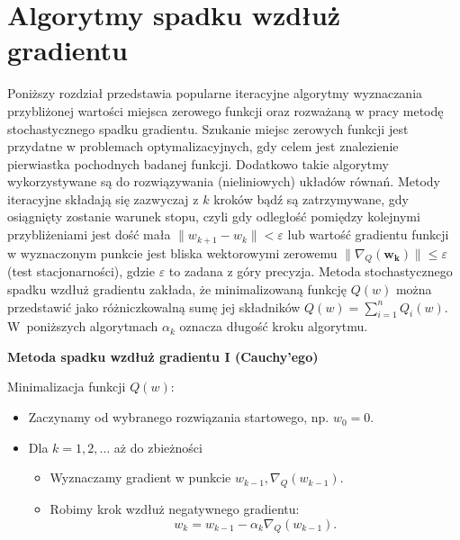 \newpage
\section{Algorytmy spadku wzdłuż gradientu}\label{R-N}

Poniższy rozdział przedstawia popularne iteracyjne algorytmy wyznaczania przybliżonej wartości miejsca zerowego funkcji oraz rozważaną w pracy metodę stochastycznego spadku gradientu. Szukanie miejsc zerowych funkcji jest przydatne w problemach optymalizacyjnych, gdy celem jest znalezienie pierwiastka pochodnych badanej funkcji. Dodatkowo takie algorytmy wykorzystywane są do rozwiązywania (nieliniowych) układów równań. Metody iteracyjne składają się zazwyczaj z $k$ kroków bądź są zatrzymywane, gdy osiągnięty zostanie warunek stopu, czyli gdy odległość pomiędzy kolejnymi przybliżeniami jest dość mała $\parallel w_{k+1}-w_k\parallel < \varepsilon$ lub wartość gradientu funkcji w wyznaczonym punkcie jest bliska wektorowymi zerowemu $\parallel \nabla_Q(\mathbf{w_k}) \parallel \leqslant \varepsilon$ (test stacjonarności), gdzie $\varepsilon$ to zadana z góry precyzja.
Metoda stochastycznego spadku wzdłuż gradientu zakłada, że minimalizowaną funkcję $Q(w)$ można przedstawić jako różniczkowalną sumę jej składników $Q(w) = \sum_{i=1}^{n}Q_i(w)$. W~poniższych algorytmach $\alpha_k$ oznacza długość kroku algorytmu.
\begin{center}
\textbf{Metoda spadku wzdłuż gradientu I (Cauchy’ego)}
\end{center}
Minimalizacja funkcji $Q(w)$:
\begin{itemize}
\item Zaczynamy od wybranego rozwiązania startowego, np. $w_{0} = 0$.
\item Dla $k = 1, 2, \dots$ aż do zbieżności
	\begin{itemize}
	\item Wyznaczamy gradient w punkcie $w_{k-1}, \nabla_{Q}(w_{k-1})$.
	\item Robimy krok wzdłuż negatywnego gradientu: $$w_{k} = w_{k-1} - \alpha_{k}\nabla_{Q}(w_{k-1}). $$
	\end{itemize}
\end{itemize}

